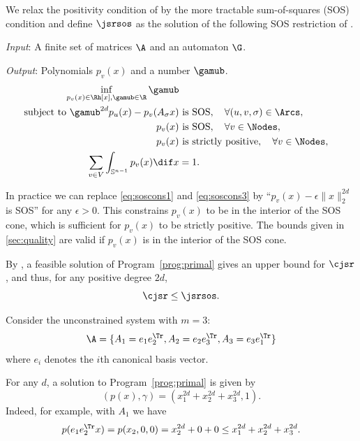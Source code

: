 \documentclass[11pt,twoside,a4paper,openright]{uclouvain-thesis}
\begin{document}
We relax the positivity condition of  by the more tractable sum-of-squares (SOS) condition and
define $\jsrsos$ as the solution of the following SOS restriction of .
\begin{myprog}[Primal]

  \emph{Input}: A finite set of matrices $\A$ and an automaton $\G$.

  \emph{Output}: Polynomials $p_v(x)$ and a number $\gamub$.
  \label{prog:primal}
  \begin{align}
    \notag
    \inf_{p_v(x) \in \Rh[x],\gamub \in \R} \gamub\\
    \label{eq:soscons2}
    \text{subject to }\gamub^{2d} p_u(x) - p_v(A_\sigma x) & \text{ is SOS}, \quad \forall (u, v, \sigma) \in \Arcs,\\
    \label{eq:soscons1}
    p_v(x) & \text{ is SOS}, \quad \forall v \in \Nodes,\\
    \label{eq:soscons3}
    p_v(x) & \text{ is strictly positive}, \quad \forall v \in \Nodes,\\
    \notag
    \sum_{v \in V} \int_{\mathbb{S}^{n-1}} p_v(x) \dif x & = 1.
  \end{align}
\end{myprog}

\begin{myrem}
  In practice we can replace \eqref{eq:soscons1} and \eqref{eq:soscons3} by ``$p_v(x) - \epsilon\|x\|_2^{2d}$ is SOS''
  for any $\epsilon > 0$.
  This constrains $p_v(x)$ to be in the interior of the SOS cone,
  which is sufficient for $p_v(x)$ to be strictly positive.
  The bounds given in \Sect\ref{sec:quality} are valid
  if $p_v(x)$ is in the interior of the SOS cone.

\end{myrem}

By ,
a feasible solution of Program~\ref{prog:primal} gives an upper bound for $\cjsr$,
and thus, for any positive degree $2d$,
\begin{equation}
  \label{eq:upperbound}
  \cjsr \leq \jsrsos.
\end{equation}


\begin{myexem}
  \label{exem:simple1}
  Consider the unconstrained system \cite[Example~2.1]{ahmadi2012joint} with $m=3$:
  \[ \A = \{ A_1 = e_1e_2^\Tr , A_2 = e_2e_3^\Tr , A_3 = e_3e_1^\Tr  \} \]
  where $e_i$ denotes the $i$th canonical basis vector.

  For any $d$, a solution to Program~\ref{prog:primal} is given by
  \[ (p(x), \gamma) = (x_1^{2d} + x_2^{2d} + x_3^{2d}, 1). \]
  Indeed, for example, with $A_1$ we have
  \[ p(e_1e_2^\Tr x) = p(x_2, 0, 0) = x_2^{2d} + 0 + 0 \leq x_1^{2d} + x_2^{2d} + x_3^{2d}. \]
\end{myexem}
\end{document}
